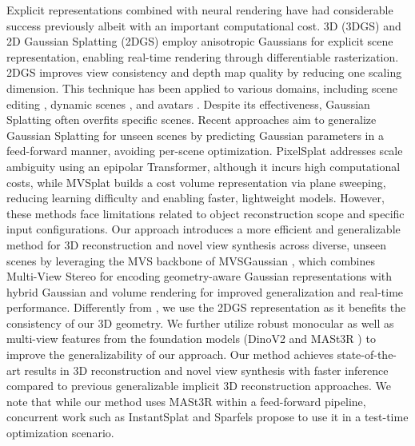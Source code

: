 Explicit representations combined with neural rendering 
\cite{aliev2020neural,jena2022neural,dnr,fvs}
have had considerable success previously albeit with an important computational cost. 3D (3DGS) \cite{kerbl20233d} and 2D Gaussian Splatting (2DGS) \cite{huang20242d} employ anisotropic Gaussians for explicit scene representation, enabling real-time rendering through differentiable rasterization. 2DGS improves view consistency and depth map quality by reducing one scaling dimension. This technique has been applied to various domains, including scene editing \cite{Gaussianeditor, cen2023saga}, dynamic scenes \cite{yang2023deformable3dgs, luiten2023dynamic, wu20234dgaussians}, and avatars \cite{GauHuman, GaussianAvatar, 3DGS-Avatar}. Despite its effectiveness, Gaussian Splatting often overfits specific scenes. Recent approaches \cite{pixelsplat, chen2024mvsplat} aim to generalize Gaussian Splatting for unseen scenes by predicting Gaussian parameters in a feed-forward manner, avoiding per-scene optimization. PixelSplat \cite{pixelsplat} addresses scale ambiguity using an epipolar Transformer, although it incurs high computational costs, while MVSplat \cite{chen2024mvsplat} builds a cost volume representation via plane sweeping, reducing learning difficulty and enabling faster, lightweight models. However, these methods face limitations related to object reconstruction scope and specific input configurations. Our approach introduces a more efficient and generalizable method for 3D reconstruction and novel view synthesis across diverse, unseen scenes by leveraging the MVS backbone of MVSGaussian \cite{liu2024fast}, which combines Multi-View Stereo for encoding geometry-aware Gaussian representations with hybrid Gaussian and volume rendering for improved generalization and real-time performance. Differently from \cite{liu2024fast}, we use the 2DGS representation as it benefits the consistency of our 3D geometry.  
We further utilize robust monocular as well as multi-view features from the foundation models (DinoV2 \cite{oquab2023dinov2} and MASt3R \cite{leroy2024grounding}) to improve the generalizability of our approach. Our method achieves state-of-the-art results in 3D reconstruction and novel view synthesis with faster inference compared to previous generalizable implicit 3D reconstruction approaches. We note that while our method uses MASt3R within a feed-forward pipeline, concurrent work such as InstantSplat \cite{instsplat} and Sparfels \cite{sparfels} propose to use it in a test-time optimization scenario.  


